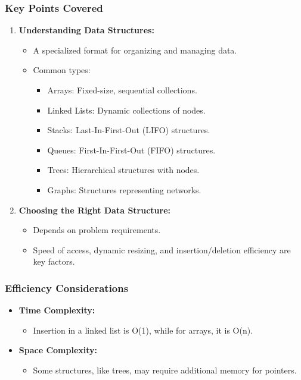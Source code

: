 \documentclass{beamer}
\begin{document}
\begin{frame}[fragile]
    \frametitle{Key Points Covered}
    \begin{enumerate}
        \item \textbf{Understanding Data Structures:}
        \begin{itemize}
            \item A specialized format for organizing and managing data.
            \item Common types:
            \begin{itemize}
                \item Arrays: Fixed-size, sequential collections.
                \item Linked Lists: Dynamic collections of nodes.
                \item Stacks: Last-In-First-Out (LIFO) structures.
                \item Queues: First-In-First-Out (FIFO) structures.
                \item Trees: Hierarchical structures with nodes.
                \item Graphs: Structures representing networks.
            \end{itemize}
        \end{itemize}
        
        \item \textbf{Choosing the Right Data Structure:}
        \begin{itemize}
            \item Depends on problem requirements.
            \item Speed of access, dynamic resizing, and insertion/deletion efficiency are key factors.
        \end{itemize}
    \end{enumerate}
\end{frame}

\begin{frame}[fragile]
    \frametitle{Efficiency Considerations}
    \begin{itemize}
        \item \textbf{Time Complexity:} 
        \begin{itemize}
            \item Insertion in a linked list is O(1), while for arrays, it is O(n).
        \end{itemize}
        
        \item \textbf{Space Complexity:} 
        \begin{itemize}
            \item Some structures, like trees, may require additional memory for pointers.
        \end{itemize}
    \end{itemize}
\end{frame}
\end{document}
